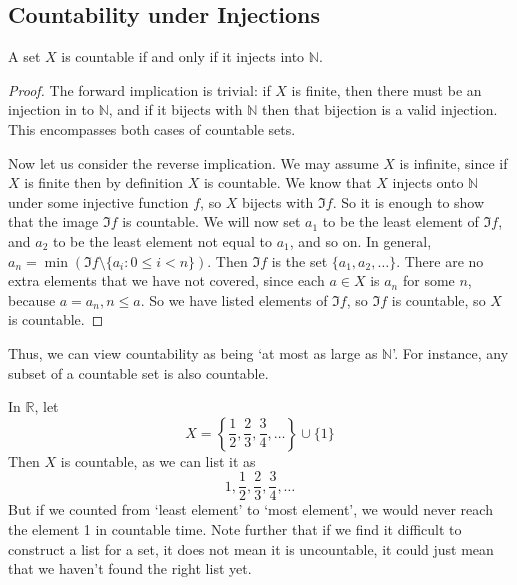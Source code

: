 \subsection{Countability under Injections}
\begin{proposition}
	A set $X$ is countable if and only if it injects into $\mathbb N$.
\end{proposition}
\begin{proof}
	The forward implication is trivial: if $X$ is finite, then there must be an injection in to $\mathbb N$, and if it bijects with $\mathbb N$ then that bijection is a valid injection. This encompasses both cases of countable sets.

	Now let us consider the reverse implication. We may assume $X$ is infinite, since if $X$ is finite then by definition $X$ is countable. We know that $X$ injects onto $\mathbb N$ under some injective function $f$, so $X$ bijects with $\Im f$. So it is enough to show that the image $\Im f$ is countable. We will now set $a_1$ to be the least element of $\Im f$, and $a_2$ to be the least element not equal to $a_1$, and so on. In general, $a_n = \min (\Im f \setminus \{ a_i : 0 \leq i < n \})$. Then $\Im f$ is the set $\{ a_1, a_2, \dots \}$. There are no extra elements that we have not covered, since each $a \in X$ is $a_n$ for some $n$, because $a=a_n, n \leq a$. So we have listed elements of $\Im f$, so $\Im f$ is countable, so $X$ is countable.
\end{proof}
Thus, we can view countability as being `at most as large as $\mathbb N$'. For instance, any subset of a countable set is also countable.

\begin{remark}
	In $\mathbb R$, let
	\[ X = \left\{ \frac{1}{2}, \frac{2}{3}, \frac{3}{4}, \dots \right\} \cup \{ 1 \} \]
	Then $X$ is countable, as we can list it as
	\[ 1, \frac{1}{2}, \frac{2}{3}, \frac{3}{4}, \dots \]
	But if we counted from `least element' to `most element', we would never reach the element 1 in countable time. Note further that if we find it difficult to construct a list for a set, it does not mean it is uncountable, it could just mean that we haven't found the right list yet.
\end{remark}

